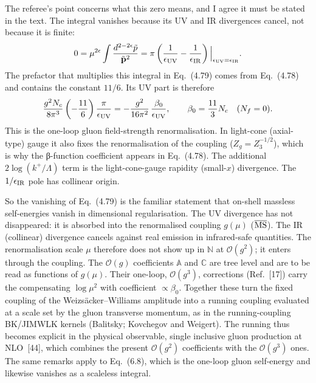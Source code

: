 \documentclass[11pt,a4paper]{article}
\newcommand{\eq}[1]{Eq.~(#1)}
\begin{document}
The referee's point concerns what this zero means, and I agree it must be stated in the text. The integral vanishes because its UV and IR divergences cancel, not because it is finite:
\begin{equation}
0=\mu^{2\epsilon}\int\frac{d^{2-2\epsilon}\tilde p}{\tilde{\mathbf p}^2}
=\pi\left(\frac{1}{\epsilon_{\rm UV}}-\frac{1}{\epsilon_{\rm IR}}\right)\Big|_{\epsilon_{\rm UV}=\epsilon_{\rm IR}} .
\label{eq:scaleless}
\end{equation}
The prefactor that multiplies this integral in \eq{4.79} comes from \eq{4.78} and contains the constant $11/6$. Its UV part is therefore
\[
\frac{g^2N_c}{8\pi^3}\left(-\frac{11}{6}\right)\frac{\pi}{\epsilon_{\rm UV}}=-\frac{g^2}{16\pi^2}\,\frac{\beta_0}{\epsilon_{\rm UV}},\qquad \beta_0=\frac{11}{3}N_c\quad(N_f=0).
\]
This is the one-loop gluon field-strength renormalisation. In light-cone (axial-type) gauge it also fixes the renormalisation of the coupling ($Z_g=Z_3^{-1/2}$), which is why the β-function coefficient appears in \eq{4.78}. The additional $2\log(k^+/\Lambda)$ term is the light-cone-gauge rapidity (small-$x$) divergence. The $1/\epsilon_{\rm IR}$ pole has collinear origin.

So the vanishing of \eq{4.79} is the familiar statement that on-shell massless self-energies vanish in dimensional regularisation. The UV divergence has not disappeared: it is absorbed into the renormalised coupling $g(\mu)$ ($\overline{\rm MS}$). The IR (collinear) divergence cancels against real emission in infrared-safe quantities. The renormalisation scale $\mu$ therefore does not show up in $\mathbb N$ at $\mathcal O(g^2)$; it enters through the coupling. The $\mathcal O(g)$ coefficients $\mathbb A$ and $\mathbb C$ are tree level and are to be read as functions of $g(\mu)$. Their one-loop, $\mathcal O(g^3)$, corrections (Ref.~[17]) carry the compensating $\log\mu^2$ with coefficient $\propto\beta_0$. Together these turn the fixed coupling of the Weizs\"acker--Williams amplitude into a running coupling evaluated at a scale set by the gluon transverse momentum, as in the running-coupling BK/JIMWLK kernels (Balitsky; Kovchegov and Weigert). The running thus becomes explicit in the physical observable, single inclusive gluon production at NLO~[44], which combines the present $\mathcal O(g^2)$ coefficients with the $\mathcal O(g^3)$ ones. The same remarks apply to \eq{6.8}, which is the one-loop gluon self-energy and likewise vanishes as a scaleless integral.
\end{document}
